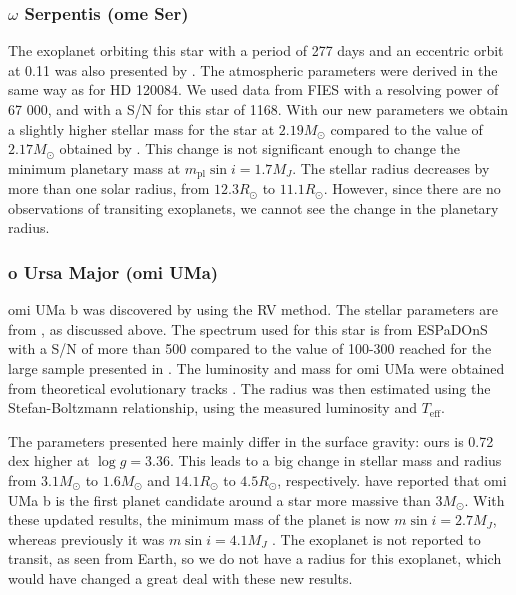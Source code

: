 \documentclass{aa}
\begin{document}
\subsubsection{$\omega$ Serpentis (ome Ser)}
\label{sub:ome_Ser}
The exoplanet orbiting this star with a period of 277 days and an eccentric
orbit at 0.11 was also presented by \citet{Sato2013}. The atmospheric parameters
were derived in the same way as for HD 120084. We used data from FIES with a
resolving power of 67 000, and with a S/N for this star of 1168. With our new
parameters we obtain a slightly higher stellar mass for the star at
$2.19M_\odot$ compared to the value of $2.17M_\odot$ obtained by
\cite{Takeda2008}. This change is not significant enough to change the minimum
planetary mass at $m_\mathrm{pl}\sin i=1.7M_J$. The stellar radius decreases by
more than one solar radius, from $12.3R_\odot$ to $11.1R_\odot$. However, since
there are no observations of transiting exoplanets, we cannot see the change in
the planetary radius.



\subsubsection{o Ursa Major (omi UMa)}
\label{sub:omiUMa}
omi UMa b was discovered by \citet{Sato2012} using the RV method. The stellar
parameters are from \citet{Takeda2008}, as discussed above. The spectrum used
for this star is from ESPaDOnS with a S/N of more than 500 compared to the value
of 100-300 reached for the large sample presented in \citet{Takeda2008}. The
luminosity and mass for omi UMa were obtained from theoretical evolutionary
tracks \citep[see][and references therein]{Sato2012}. The radius was then
estimated using the Stefan-Boltzmann relationship, using the measured luminosity
and $T_\mathrm{eff}$.

The parameters presented here mainly differ in the surface gravity: ours is 0.72
dex higher at $\log g=3.36$. This leads to a big change in stellar mass and
radius from $3.1M_\odot$ to $1.6M_\odot$ and $14.1R_\odot$ to $4.5R_\odot$,
respectively. \citet{Sato2012} have reported that omi UMa b is the first planet
candidate around a star more massive than $3M_\odot$. With these updated
results, the minimum mass of the planet is now $m\sin i=2.7M_J$, whereas
previously it was $m\sin i=4.1M_J$ \citep{Sato2012}. The exoplanet is not
reported to transit, as seen from Earth, so we do not have a radius for this
exoplanet, which would have changed a great deal with these new results.
\end{document}
